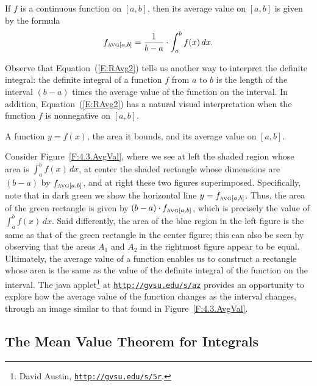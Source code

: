 {If $f$ is a continuous function on $[a,b]$, then its average value on $[a,b]$ is given by the formula
\[ f_{\mbox{\tiny{AVG}}[a,b]} = \frac{1}{b-a} \cdot \int_a^b f(x) \, dx. \]
} %

Observe that Equation~(\ref{E:RAvg2}) tells us another way to interpret the definite integral:  the definite integral of a function $f$ from $a$ to $b$ is the length of the interval $(b-a)$ times the average value of the function on the interval.  In addition, Equation~(\ref{E:RAvg2}) has a natural visual interpretation when the function $f$ is nonnegative on $[a,b]$.  
\begin{marginfigure} %
\caption{A function $y = f(x)$, the area it bounds, and its average value on $[a,b]$.} \label{F:4.3.AvgVal}
\end{marginfigure}
Consider Figure~\ref{F:4.3.AvgVal}, where we see at left the shaded region whose area is $\int_a^b f(x) \, dx$, at center the shaded rectangle whose dimensions are $(b-a)$ by $f_{\mbox{\tiny{AVG}}[a,b]}$, and at right these two figures superimposed.  Specifically, note that in dark green we show the horizontal line $y = f_{\mbox{\tiny{AVG}}[a,b]}$.  Thus, the area of the green rectangle is given by $(b-a) \cdot f_{\mbox{\tiny{AVG}}[a,b]}$, which is precisely the value of $\int_a^b f(x) \, dx$.  Said differently, the area of the blue region in the left figure is the same as that of the green rectangle in the center figure; this can also be seen by observing that the areas $A_1$ and $A_2$ in the rightmost figure appear to be equal.  Ultimately, the average value of a function enables us to construct a rectangle whose area is the same as the value of the definite integral of the function on the interval.  The java applet\footnote{David Austin, \href{http://gvsu.edu/s/5r}{\texttt{http://gvsu.edu/s/5r}}.} at \href{http://gvsu.edu/s/az}{\texttt{http://gvsu.edu/s/az}} provides an opportunity to explore how the average value of the function changes as the interval changes, through an image similar to that found in Figure~\ref{F:4.3.AvgVal}.



\subsection*{The Mean Value Theorem for Integrals}

